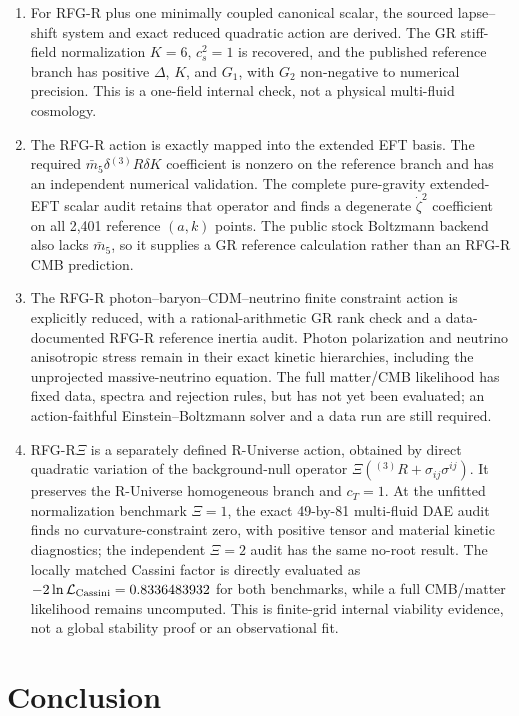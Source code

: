 \documentclass[11pt,a4paper]{article}
\begin{document}
\begin{enumerate}
\item For RFG-R plus one minimally coupled canonical scalar, the sourced lapse--shift system and exact reduced quadratic action are derived. The GR stiff-field normalization \(K=6\), \(c_s^2=1\) is recovered, and the published reference branch has positive \(\Delta\), \(K\), and \(G_1\), with \(G_2\) non-negative to numerical precision. This is a one-field internal check, not a physical multi-fluid cosmology.
\item The RFG-R action is exactly mapped into the extended EFT basis. The required \(\bar m_5\delta{}^{(3)}R\delta K\) coefficient is nonzero on the reference branch and has an independent numerical validation. The complete pure-gravity extended-EFT scalar audit retains that operator and finds a degenerate \(\dot\zeta^2\) coefficient on all 2,401 reference \((a,k)\) points. The public stock Boltzmann backend also lacks \(\bar m_5\), so it supplies a GR reference calculation rather than an RFG-R CMB prediction.
\item The RFG-R photon--baryon--CDM--neutrino finite constraint action is explicitly reduced, with a rational-arithmetic GR rank check and a data-documented RFG-R reference inertia audit. Photon polarization and neutrino anisotropic stress remain in their exact kinetic hierarchies, including the unprojected massive-neutrino equation. The full matter/CMB likelihood has fixed data, spectra and rejection rules, but has not yet been evaluated; an action-faithful Einstein--Boltzmann solver and a data run are still required.
\item RFG-R\(\Xi\) is a separately defined R-Universe action, obtained by direct quadratic variation of the background-null operator \(\Xi({}^{(3)}R+\sigma_{ij}\sigma^{ij})\). It preserves the R-Universe homogeneous branch and \(c_T=1\). At the unfitted normalization benchmark \(\Xi=1\), the exact 49-by-81 multi-fluid DAE audit finds no curvature-constraint zero, with positive tensor and material kinetic diagnostics; the independent \(\Xi=2\) audit has the same no-root result. The locally matched Cassini factor is directly evaluated as \(-2\ln\mathcal L_{\rm Cassini}=0.8336483932\) for both benchmarks, while a full CMB/matter likelihood remains uncomputed. This is finite-grid internal viability evidence, not a global stability proof or an observational fit.
\end{enumerate}


\newpage
\section{Conclusion}
\end{document}
